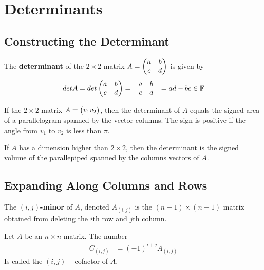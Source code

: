\section{Determinants}

\subsection{Constructing the Determinant}
\begin{definition}
    The \textbf{determinant} of the $2 \times 2$ matrix $A = \begin{pmatrix} a & b \\ c & d \end{pmatrix}$ is given by
    \begin{align*}
        det A = det\begin{pmatrix} a & b \\ c & d \end{pmatrix} = \left| \begin{array}{cc} a & b \\ c & d \end{array} \right| = ad - bc \in \mathbb{F}
    \end{align*}
\end{definition}

\begin{remark}
    If the $2 \times 2$ matrix $A = \begin{pmatrix} v_1 v_2 \end{pmatrix}$, then the determinant of $A$ equals the signed area of a parallelogram spanned by the vector columns.
    The sign is positive if the angle from $v_1$ to $v_2$ is less than $\pi$.

    If $A$ has a dimension higher than $2 \times 2$, then the determinant is the signed volume of the parallepiped spanned by the columns vectors of 
    $A$.
\end{remark}


\subsection{Expanding Along Columns and Rows}
\begin{notation}
    The \textbf{$(i,j)$-minor} of $A$, denoted $A_{(i,j)}$ is the $(n-1) \times (n - 1)$ matrix obtained from deleting the $i$th row and $j$th column.
\end{notation}

\begin{definition}
    Let $A$ be an $n \times n$ matrix. The number 
    \begin{align*}
        C_{(i,j)} &= (-1)^{i + j} A_{(i,j)}
    \end{align*}
    Is called the $(i,j)-$cofactor of $A$.
\end{definition}

